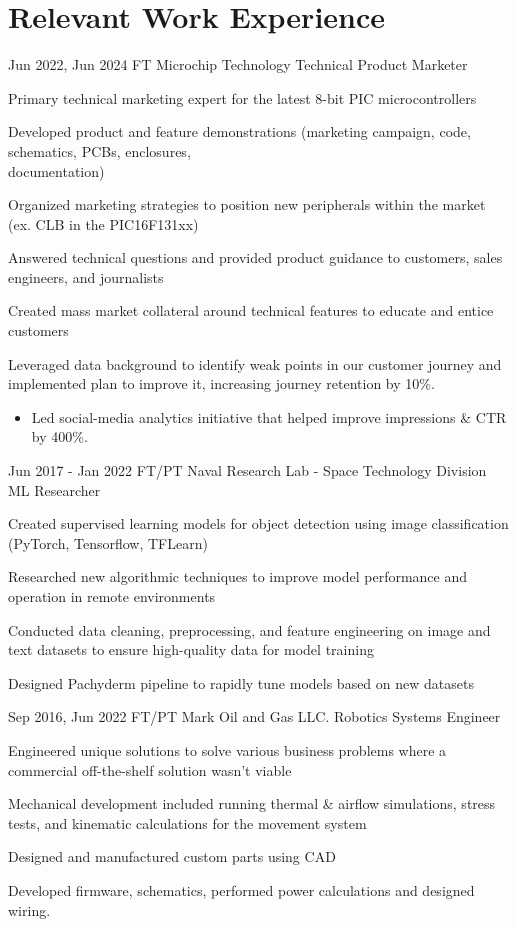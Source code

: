 \documentclass[
	12pt, %
]{FreemanCV}
\begin{document}
\section{Relevant Work Experience}

\jobentry
	{Jun 2022, Jun 2024} %
	{FT} %
	{Microchip Technology} %
	{Technical Product Marketer} %
	{ %
		\item Primary technical marketing expert for the latest 8-bit PIC microcontrollers
		\item Developed product and feature demonstrations (marketing campaign, code, schematics, PCBs, enclosures,\\documentation)
		\item Organized marketing strategies to position new peripherals within the market (ex. CLB in the PIC16F131xx)
		\item Answered technical questions and provided product guidance to customers, sales engineers, and journalists
		\item Created mass market collateral around technical features to educate and entice customers
		\item Leveraged data background to identify weak points in our customer journey and implemented plan to improve it, increasing journey retention by 10\%.
		\begin{itemize}[topsep=-10pt]
		\item Led social-media analytics initiative that helped improve impressions \& CTR by 400\%.
		\end{itemize}
	} 


\jobentry
	{Jun 2017 - Jan 2022} %
	{FT/PT} %
	{Naval Research Lab - Space Technology Division} %
	{ML Researcher} %
	{ %
		\item Created supervised learning models for object detection using image classification (PyTorch, Tensorflow, TFLearn)
		\item Researched new algorithmic techniques to improve model performance and operation in remote environments
		\item Conducted data cleaning, preprocessing, and feature engineering on image and text datasets to ensure high-quality data for model training
		\item Designed Pachyderm pipeline to rapidly tune models based on new datasets
	} 
	

	
\jobentry
{Sep 2016, Jun 2022} %
{FT/PT} %
{Mark Oil and Gas LLC.} %
{Robotics Systems Engineer} %
{ %
	\item Engineered unique solutions to solve various business problems where a commercial off-the-shelf solution wasn't viable
	\item Mechanical development included running thermal \& airflow simulations, stress tests, and kinematic calculations for the movement system
	\item Designed and manufactured custom parts using CAD
	\item Developed firmware, schematics, performed power calculations and designed wiring.
}
\end{document}
